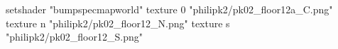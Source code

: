 setshader "bumpspecmapworld"
    texture 0 "philipk2/pk02_floor12a_C.png"
    texture n "philipk2/pk02_floor12_N.png"
    texture s "philipk2/pk02_floor12_S.png"